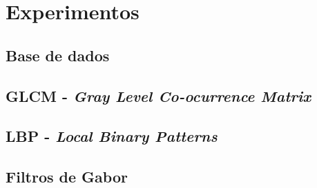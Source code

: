\chapter{Experimentos}\label{cap:metodologia}


\section{Base de dados}\label{sec:bd}

\section{GLCM - \textit{Gray Level Co-ocurrence Matrix}}\label{sec:glcm}

\section{LBP - \textit{Local Binary Patterns}}\label{sec:lbp}

\section{Filtros de Gabor}\label{sec:gabor}
